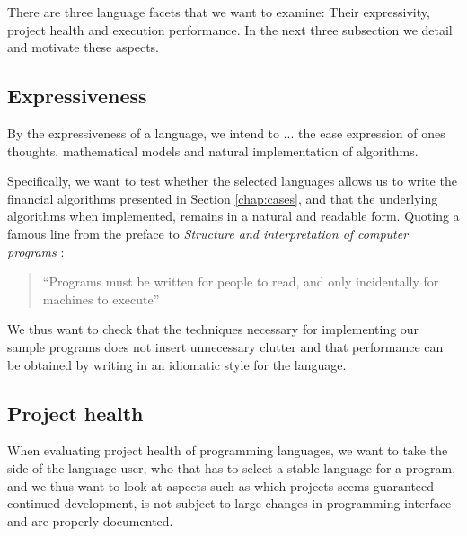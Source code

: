 

There are three language facets that we want to examine: Their
expressivity, project health and execution performance. In the next
three subsection we detail and motivate these aspects.

\subsection{Expressiveness}
By the expressiveness of a language, we intend to ... the ease
expression of ones thoughts, mathematical models and natural
implementation of algorithms.


Specifically, we want to test whether the selected languages allows us
to write the financial algorithms presented in Section
\ref{chap:cases}, and that the underlying algorithms when implemented,
remains in a natural and readable form. Quoting a famous line from the
preface to \emph{Structure and interpretation of computer programs}
\cite{abelson1996structure}:
\begin{quote}
  ``Programs must be written for people to read, and only
  incidentally for machines to execute''
\end{quote}
We thus want to check that the techniques necessary for implementing
our sample programs does not insert unnecessary clutter and that
performance can be obtained by writing in an idiomatic style for the
language.


\subsection{Project health} 
When evaluating project health of programming languages, we want to
take the side of the language user, who that has to select a stable
language for a program, and we thus want to look at aspects such as
which projects seems guaranteed continued development, is not subject
to large changes in programming interface and are properly documented.

